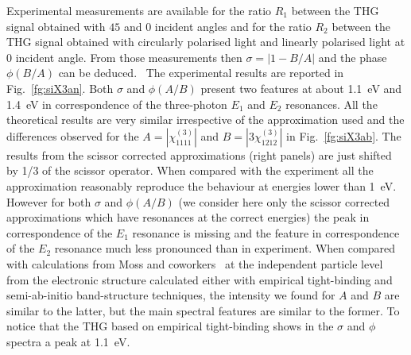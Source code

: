Experimental measurements are available for the ratio $R_1$ between the THG signal obtained with $45$ and $0$ incident angles and for the ratio $R_2$ between the THG signal obtained with circularly polarised light and linearly polarised light at $0$ incident angle. From those measurements then $\sigma = |1 - B/A|$ and the phase $\phi(B/A)$ can be deduced.~\cite{Moss:89} The experimental results are reported in Fig.~\ref{fg:siX3an}. Both $\sigma$ and $\phi(A/B)$ present two features at about 1.1~eV and 1.4~eV in correspondence of the three-photon $E_1$ and $E_2$ resonances. All the theoretical results are very similar irrespective of the approximation used and the differences observed for the $A=|\chi^{(3)}_{1111}|$ and $B=|3\chi^{(3)}_{1212}|$ in Fig.~\ref{fg:siX3ab}. The results from the scissor corrected approximations (right panels) are just shifted by 1/3 of the scissor operator. When compared with the experiment all the approximation reasonably reproduce the behaviour at energies lower than 1~eV. However for both $\sigma$ and $\phi(A/B)$ (we consider here only the scissor corrected approximations which have resonances at the correct energies) the peak in correspondence of the $E_1$ resonance is missing and the feature in correspondence of the $E_2$ resonance much less pronounced than in experiment. When compared with calculations from Moss and coworkers~\cite{Moss1990} at the independent particle level from the electronic structure calculated either with empirical tight-binding and semi-ab-initio band-structure techniques, the intensity we found for $A$ and $B$ are similar to the latter, but the main spectral features are similar to the former. To notice that the THG based on empirical tight-binding shows in the $\sigma$ and $\phi$ spectra a peak at 1.1~eV.    


